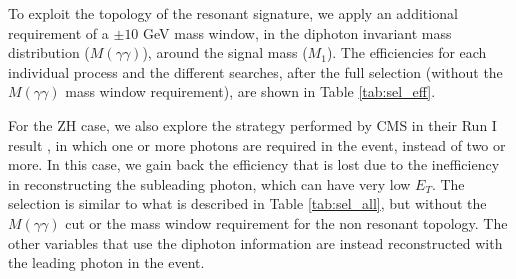 

To exploit the topology of the resonant signature, we apply an additional requirement of a $\pm10$ GeV mass window, in the diphoton invariant mass distribution ($M(\gamma\gamma)$), around the signal mass ($M_1$). The efficiencies for each individual process and the different searches, after the full selection (without the $M(\gamma\gamma)$ mass window requirement), are shown in Table \ref{tab:sel_eff}.

For the ZH case, we also explore the strategy performed by CMS in their Run I result \cite{lowmonophoton}, in which one or more photons are required in the event, instead of two or more. In this case, we gain back the efficiency that is lost due to the inefficiency in reconstructing the subleading photon, which can have very low $E_T$. The selection is similar to what is described in Table \ref{tab:sel_all}, but without the $M(\gamma\gamma)$ cut or the mass window requirement for the non resonant topology. The other variables that use the diphoton information are instead reconstructed with the leading photon in the event.

